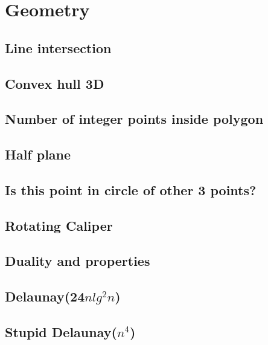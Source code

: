 \section{Geometry}
\subsection{Line intersection}
\raggedbottom
\hrulefill
\subsection{Convex hull 3D}
\raggedbottom
\hrulefill
\subsection{Number of integer points inside polygon}
\raggedbottom
\hrulefill
\subsection{Half plane}
\raggedbottom
\hrulefill
\subsection{Is this point in circle of other 3 points?}
\raggedbottom
\hrulefill
\subsection{Rotating Caliper}
\raggedbottom
\hrulefill
\subsection{Duality and properties}

\hrulefill
\subsection{Delaunay(24$nlg^2n$)}
\raggedbottom
\hrulefill
\subsection{Stupid Delaunay($n^4$)}
\raggedbottom
\hrulefill

